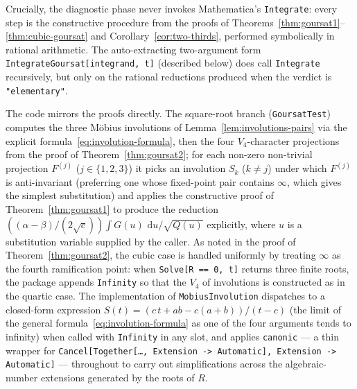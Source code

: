 \documentclass[11pt,a4paper]{article}
\theoremstyle{plain}
\theoremstyle{definition}
\theoremstyle{remark}
\renewcommand{\d}{\,\mathrm{d}}
\begin{document}
Crucially, the diagnostic phase never invokes Mathematica's \texttt{Integrate}: every step is the constructive procedure from the proofs of Theorems~\ref{thm:goursat1}--\ref{thm:cubic-goursat} and Corollary~\ref{cor:two-thirds}, performed symbolically in rational arithmetic. The auto-extracting two-argument form \texttt{IntegrateGoursat[integrand, t]} (described below) does call \texttt{Integrate} recursively, but only on the rational reductions produced when the verdict is \texttt{"elementary"}.

The code mirrors the proofs directly. The square-root branch (\texttt{GoursatTest}) computes the three M\"obius involutions of Lemma~\ref{lem:involutions-pairs} via the explicit formula~\eqref{eq:involution-formula}, then the four $V_4$-character projections from the proof of Theorem~\ref{thm:goursat2}; for each non-zero non-trivial projection $F^{(j)}$ ($j\in\{1,2,3\}$) it picks an involution $S_k$ ($k\neq j$) under which $F^{(j)}$ is anti-invariant (preferring one whose fixed-point pair contains $\infty$, which gives the simplest substitution) and applies the constructive proof of Theorem~\ref{thm:goursat1} to produce the reduction $((\alpha-\beta)/(2\sqrt{c}))\int G(u)\,\d u/\sqrt{Q(u)}$ explicitly, where $u$ is a substitution variable supplied by the caller. As noted in the proof of Theorem~\ref{thm:goursat2}, the cubic case is handled uniformly by treating $\infty$ as the fourth ramification point: when \texttt{Solve[R == 0, t]} returns three finite roots, the package appends \texttt{Infinity} so that the $V_4$ of involutions is constructed as in the quartic case. The implementation of \texttt{MobiusInvolution} dispatches to a closed-form expression $S(t) = (c\,t + ab - c(a+b))/(t-c)$ (the limit of the general formula~\eqref{eq:involution-formula} as one of the four arguments tends to infinity) when called with \texttt{Infinity} in any slot, and applies \texttt{canonic} --- a thin wrapper for \texttt{Cancel[Together[\dots, Extension -> Automatic], Extension -> Automatic]} --- throughout to carry out simplifications across the algebraic-number extensions generated by the roots of $R$.
\end{document}

